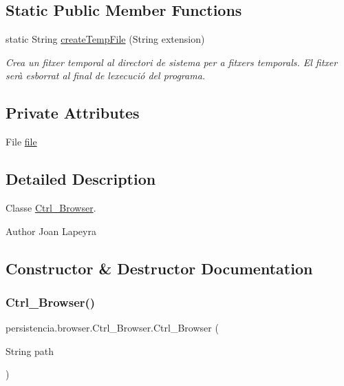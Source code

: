 \subsection*{Static Public Member Functions}
\begin{DoxyCompactItemize}
\item 
static String \hyperlink{classpersistencia_1_1browser_1_1Ctrl__Browser_ad64712e539747815fb590a7adfaf5517}{create\+Temp\+File} (String extension)
\begin{DoxyCompactList}\small\item\em Crea un fitxer temporal al directori de sistema per a fitxers temporals. El fitxer serà esborrat al final de l\textquotesingle{}execució del programa. \end{DoxyCompactList}\end{DoxyCompactItemize}
\subsection*{Private Attributes}
\begin{DoxyCompactItemize}
\item 
File \hyperlink{classpersistencia_1_1browser_1_1Ctrl__Browser_a72c151aed575c0848f7dbb1609b373c8}{file}
\end{DoxyCompactItemize}


\subsection{Detailed Description}
Classe \hyperlink{classpersistencia_1_1browser_1_1Ctrl__Browser}{Ctrl\+\_\+\+Browser}. 

\begin{DoxyAuthor}{Author}
Joan Lapeyra 
\end{DoxyAuthor}


\subsection{Constructor \& Destructor Documentation}
\mbox{\label{classpersistencia_1_1browser_1_1Ctrl__Browser_a6cd8687a9748fc4c169d1d72be7081b1}} 
\subsubsection{\texorpdfstring{Ctrl\+\_\+\+Browser()}{Ctrl\_Browser()}}
{\footnotesize\ttfamily persistencia.\+browser.\+Ctrl\+\_\+\+Browser.\+Ctrl\+\_\+\+Browser (\begin{DoxyParamCaption}\item[{String}]{path }\end{DoxyParamCaption})\hspace{0.3cm}{\ttfamily [inline]}}




